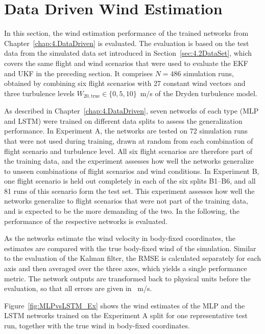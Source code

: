 \section{Data Driven Wind Estimation}
\label{sec:5.xDataDrivenWindEstimation}

In this section, the wind estimation performance of the trained networks from Chapter~\ref{chap:4.DataDriven} is evaluated. The evaluation is based on the test data from the simulated data set introduced in Section~\ref{sec:4.2DataSet}, which covers the same flight and wind scenarios that were used to evaluate the EKF and UKF in the preceding section.
It comprises $N = 486$ simulation runs, obtained by combining six flight scenarios with 27 constant wind vectors and three turbulence levels $W_{20,\mathrm{true}} \in \{0,5,10\}$\SI{}{m/s} of the Dryden turbulence model. 

As described in Chapter~\ref{chap:4.DataDriven}, seven networks of each type (MLP and LSTM) were trained on different data splits to assess the generalization performance. In Experiment A, the networks are tested on 72 simulation runs that were not used during training, drawn at random from each combination of flight scenario and turbulence level. All six flight scenarios are therefore part of the training data, and the experiment assesses how well the networks generalize to unseen combinations of flight scenarios and wind conditions. In Experiment B, one flight scenario is held out completely in each of the six splits B1--B6, and all 81 runs of this scenario form the test set. This experiment assesses how well the networks generalize to flight scenarios that were not part of the training data, and is expected to be the more demanding of the two. In the following, the performance of the respective networks is evaluated.

As the networks estimate the wind velocity in body-fixed coordinates, the estimates are compared with the true body-fixed wind of the simulation. Similar to the evaluation of the Kalman filter, the RMSE is calculated separately for each axis and then averaged over the three axes, which yields a single performance metric. The network outputs are transformed back to physical units before the evaluation, so that all errors are given in \SI{}{m/s}.

Figure~\ref{fig:MLPvsLSTM_Ex} shows the wind estimates of the MLP and the LSTM networks trained on the Experiment A split for one representative test run, together with the true wind in body-fixed coordinates.

